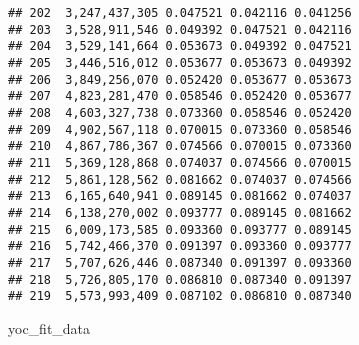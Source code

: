 \documentclass[]{article}
\newenvironment{Shaded}{\begin{snugshade}}{\end{snugshade}}
\newcommand{\NormalTok}[1]{#1}
\begin{document}
\begin{verbatim}
## 202  3,247,437,305 0.047521 0.042116 0.041256
## 203  3,528,911,546 0.049392 0.047521 0.042116
## 204  3,529,141,664 0.053673 0.049392 0.047521
## 205  3,446,516,012 0.053677 0.053673 0.049392
## 206  3,849,256,070 0.052420 0.053677 0.053673
## 207  4,823,281,470 0.058546 0.052420 0.053677
## 208  4,603,327,738 0.073360 0.058546 0.052420
## 209  4,902,567,118 0.070015 0.073360 0.058546
## 210  4,867,786,367 0.074566 0.070015 0.073360
## 211  5,369,128,868 0.074037 0.074566 0.070015
## 212  5,861,128,562 0.081662 0.074037 0.074566
## 213  6,165,640,941 0.089145 0.081662 0.074037
## 214  6,138,270,002 0.093777 0.089145 0.081662
## 215  6,009,173,585 0.093360 0.093777 0.089145
## 216  5,742,466,370 0.091397 0.093360 0.093777
## 217  5,707,626,446 0.087340 0.091397 0.093360
## 218  5,726,805,170 0.086810 0.087340 0.091397
## 219  5,573,993,409 0.087102 0.086810 0.087340
\end{verbatim}

\begin{Shaded}
\begin{Highlighting}[]
\NormalTok{yoc_fit_data}
\end{Highlighting}
\end{Shaded}
\end{document}
